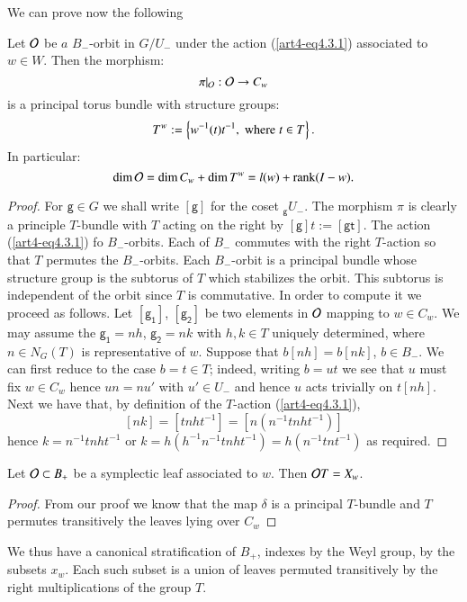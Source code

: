 We can prove now the following

\begin{prop*}
Let $\mathcal{O}$ be $a$ $B_{-}$-orbit in $G/U_{-} $ under the action (\ref{art4-eq4.3.1}) associated to $w \in W$. Then the morphism:
$$
\pi|_{\mathcal{O}} :\mathcal{O} \rightarrow C_{w}
$$
is a principal torus bundle with structure groups:
$$
T^{w}:= \left\{w^{-1}(t)t^{-1},\; \text{\rm where} \; t\in T\right\}.
$$
In particular:
$$
\dim\mathcal{O} = \dim C_{w} + \dim T^{w} = l(w) + \operatorname{rank}(I -w).
$$
\end{prop*}

\begin{proof}
For $\mathsf{g} \in G$ we shall write $[\mathsf{g}]$ for the coset ${}_{\mathsf{g}}U_{-}$. The morphism $\pi$ is clearly a principle $T$-bundle with $T$ acting on the right by $[\mathsf{g}]t := [\mathsf{gt}]$. The action (\ref{art4-eq4.3.1}) fo $B_{-}$-orbits. Each of $B_{-}$ commutes with the right $T$-action so that $T$ permutes the $B_{-}$-orbits. Each $B_{-}$-orbit is a principal bundle whose structure group is the subtorus of $T$ which stabilizes the orbit. This subtorus is independent of the orbit since $T$ is commutative. In order to compute it we proceed as follows. Let $[\mathsf{g_{1}}]$, $[\mathsf{g_{2}}]$ be two elements in $\mathcal{O}$ mapping to $w \in C_{w}$. We may assume the $\mathsf{g_{1}} = nh$, $\mathsf{g_{2}} = nk$ with $h, k \in T$ uniquely determined, where $n\in N_{G}(T)$ is representative of $w$. Suppose that $b[nh] = b[nk]$, $b \in B_{-}$. We can first reduce to the case $b=t \in T$; indeed, writing $b = ut$ we see that $u$ must fix $w \in C_{w}$ hence $un = nu'$ with $u' \in U_{-}$ and hence $u$ acts trivially on $t[nh]$. Next we have that, by definition of the $T$-action (\ref{art4-eq4.3.1}),
$$
[nk] = \left[tnht^{-1}\right] = \left[n(n^{-1}tnht^{-1})\right]
$$
hence $k=n^{-1}tnht^{-1}$ or $k=h\left(h^{-1}n^{-1}tnht^{-1}\right) = h\left(n^{-1}tnt^{-1}\right)$ as required.
\end{proof}

\begin{lemma*}
Let $\mathcal{O} \subset B_{+}$ be a symplectic leaf associated to $w$. Then $\mathcal{O} T = X_{w}$.
\end{lemma*}

\begin{proof}
From our proof we know that the map $\delta$ is a principal $T$-bundle and $T$ permutes transitively the leaves lying over $C_{w}$
\end{proof}

We thus have a canonical stratification of $B_{+}$, indexes by the Weyl group, by the subsets $x_{w}$. Each such subset is a union of leaves permuted transitively by the right multiplications of the group $T$.

